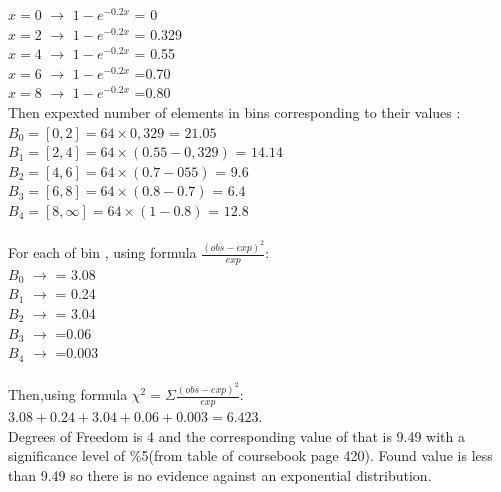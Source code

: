 \documentclass[11pt]{article}
\begin{document}
$x=0$ $\rightarrow $  $1-e^{-0.2 x}$ = 0\\

$x=2$ $\rightarrow $ $1-e^{-0.2 x}$ = 0.329\\

$x=4$ $\rightarrow $ $1-e^{-0.2 x}$ = 0.55\\

$x=6$ $\rightarrow $ $1-e^{-0.2 x}$ =0.70\\

$x=8$ $\rightarrow $ $1-e^{-0.2 x}$ =0.80\\

Then expexted number of elements in bins corresponding to their values :\\

$B_0=[0,2] = 64 \times 0,329$ = $21.05$\\

$B_1=[2,4] = 64 \times (0.55-0,329)$ = $14.14$\\

$B_2=[4,6] = 64 \times (0.7-055)$ = $9.6$\\

$B_3=[6,8] = 64 \times(0.8-0.7)$ = $6.4$\\

$B_4=[8,\infty] = 64 \times (1-0.8)$ = $12.8$\\\\
For each of bin , using formula $\frac{{(obs -exp)}^2}{exp}$:\\

$B_0$ $\rightarrow $ = 3.08\\

$B_1$ $\rightarrow $ = 0.24\\

$B_2$ $\rightarrow $ = 3.04\\

$B_3$ $\rightarrow $ =0.06\\

$B_4$ $\rightarrow $ =0.003\\\\

Then,using formula $\chi^2 = \Sigma \frac{{(obs -exp)}^2}{exp}$:\\

$3.08 + 0.24 + 3.04 + 0.06 + 0.003=6.423$.\\

Degrees of Freedom is 4  and the corresponding value of that is 9.49 with a significance level of \%5(from table of coursebook page 420). Found value is less than 9.49 so there is no evidence against an exponential distribution. 
\end{document}
